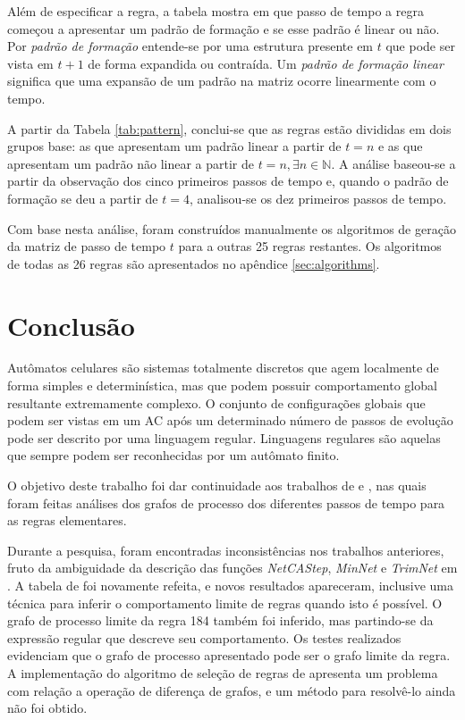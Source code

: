 \documentclass[12pt,a4paper]{article}
\begin{document}
Além de especificar a regra, a tabela mostra em que passo de tempo a regra
começou a apresentar um padrão de formação e se esse padrão é linear
ou não. Por \textit{padrão de formação} entende-se por uma estrutura
presente em $t$ que pode ser vista em $t+1$ de forma expandida ou contraída.
Um \textit{padrão de formação linear} significa que uma
expansão de um padrão na matriz ocorre linearmente com o tempo.

A partir da Tabela \ref{tab:pattern}, conclui-se que as regras estão divididas
em dois grupos base: as que apresentam um padrão linear a partir de $t=n$ e as que
apresentam um padrão não linear a partir de $t=n,\exists n \in \mathbb{N}$.
A análise baseou-se a partir da observação dos cinco primeiros passos de
tempo e, quando o padrão de formação se deu a partir de $t=4$, analisou-se
os dez primeiros passos de tempo.

Com base nesta análise, foram construídos manualmente os algoritmos de geração da matriz
de passo de tempo $t$ para a outras 25 regras restantes. Os algoritmos de todas as
26 regras são apresentados no apêndice \ref{sec:algorithms}.

\newpage

\section{Conclusão}\label{sec:conclude}

Autômatos celulares são sistemas totalmente discretos que agem localmente
de forma simples e determinística, mas que podem possuir
comportamento global resultante extremamente complexo. O conjunto de
configurações globais que podem ser vistas em um AC após um determinado
número de passos de evolução pode ser descrito por uma linguagem
regular. Linguagens regulares são aquelas que sempre podem ser reconhecidas
por um autômato finito.

O objetivo deste trabalho foi dar continuidade aos trabalhos de
 e , nas quais foram feitas
análises dos grafos de processo dos diferentes passos de tempo
para as regras elementares.

Durante a pesquisa, foram encontradas inconsistências nos trabalhos anteriores,
fruto da ambiguidade da descrição das funções \emph{NetCAStep}, \emph{MinNet} e \emph{TrimNet}
em . A tabela de  foi novamente
refeita, e novos resultados apareceram, inclusive uma técnica para inferir
o comportamento limite de regras quando isto é possível. O grafo de processo
limite da regra 184 também foi inferido, mas partindo-se da expressão regular
que descreve seu comportamento. Os testes realizados evidenciam que o grafo
de processo apresentado pode ser o grafo limite da regra. A implementação do
algoritmo de seleção de regras de  apresenta um
problema com relação a operação de diferença de grafos, e um método para
resolvê-lo ainda não foi obtido.
\end{document}

